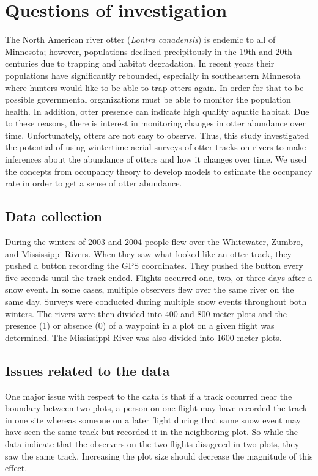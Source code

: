 \documentclass[12pt]{article}
\begin{document}
\section{Questions of investigation}
The North American river otter (\textit{Lontra canadensis}) is endemic to all of
Minnesota; however, populations declined precipitously in the 19th and 20th
centuries due to trapping and habitat degradation. In recent years their
populations have significantly rebounded, especially in southeastern Minnesota
where hunters would like to be able to trap otters again. In order for that to
be possible governmental organizations must be able to monitor the population
health. In addition, otter presence can indicate high quality aquatic habitat.
Due to these reasons, there is interest in monitoring changes in otter abundance
over time. Unfortunately, otters are not easy to observe. Thus, this study
investigated the potential of using wintertime aerial surveys of otter tracks on
rivers to make inferences about the abundance of otters and how it changes over
time. We used the concepts from occupancy theory to develop models to estimate
the occupancy rate in order to get a sense of otter abundance.

    \subsection{Data collection}
    During the winters of 2003 and 2004 people flew over the Whitewater, Zumbro,
    and Mississippi Rivers. When they saw what looked like an otter track, they
    pushed a button recording the GPS coordinates. They pushed the button every
    five seconds until the track ended. Flights occurred one, two, or three days
    after a snow event. In some cases, multiple observers flew over the same
    river on the same day. Surveys were conducted during multiple snow events
    throughout both winters. The rivers were then divided into 400 and 800 meter
    plots and the presence (1) or absence (0) of a waypoint in a plot on a given
    flight was determined. The Mississippi River was also divided into 1600
    meter plots.

    \subsection{Issues related to the data}
    One major issue with respect to the data is that if a track occurred near
    the boundary between two plots, a person on one flight may have recorded the
    track in one site whereas someone on a later flight during that same snow
    event may have seen the same track but recorded it in the neighboring plot.
    So while the data indicate that the observers on the two flights disagreed
    in two plots, they saw the same track. Increasing the plot size should
    decrease the magnitude of this effect.
\end{document}
